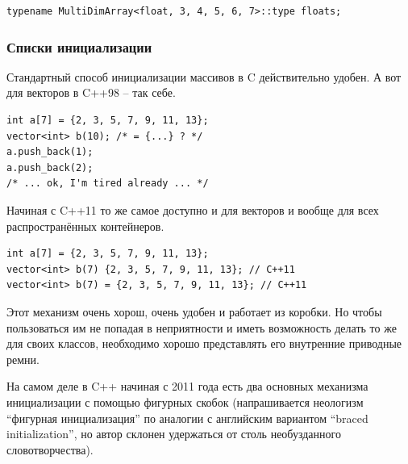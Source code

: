 \documentclass[a4paper,12pt,oneside]{article}
\newif\ifanswers
\begin{document}
\begin{lstlisting}
typename MultiDimArray<float, 3, 4, 5, 6, 7>::type floats;
\end{lstlisting}

\ifanswers
Правильный ответ: да и даже не так сложно

\begin{lstlisting}
template <class T, size_t I, size_t... J>
struct MultiDimArray 
{
  using Nested = typename MultiDimArray<T, J...>::type;
  using type = std::array<Nested, I>;
};
 
template <class T, size_t I>
struct MultiDimArray<T, I> 
{
  using type = std::array<T, I>;
};
\end{lstlisting}

К этому моменту курса это должно стать обычной задачей на вариабельные шаблоны.
\fi

\subsubsection{Списки инициализации}

Стандартный способ инициализации массивов в C действительно удобен. А вот для векторов в C++98 -- так себе.

\begin{lstlisting}
int a[7] = {2, 3, 5, 7, 9, 11, 13};
vector<int> b(10); /* = {...} ? */
a.push_back(1);
a.push_back(2);
/* ... ok, I'm tired already ... */
\end{lstlisting}

Начиная с C++11 то же самое доступно и для векторов и вообще для всех распространённых контейнеров.

\begin{lstlisting}
int a[7] = {2, 3, 5, 7, 9, 11, 13};
vector<int> b(7) {2, 3, 5, 7, 9, 11, 13}; // C++11
vector<int> b(7) = {2, 3, 5, 7, 9, 11, 13}; // C++11
\end{lstlisting}

Этот механизм очень хорош, очень удобен и работает из коробки. Но чтобы пользоваться им не попадая в неприятности и иметь возможность делать то же для своих классов, необходимо хорошо представлять его внутренние приводные ремни.

На самом деле в C++ начиная с 2011 года есть два основных механизма инициализации с помощью фигурных скобок (напрашивается неологизм ``фигурная инициализация'' по аналогии с английским вариантом ``braced initialization'', но автор склонен удержаться от столь необузданного словотворчества).
\end{document}
